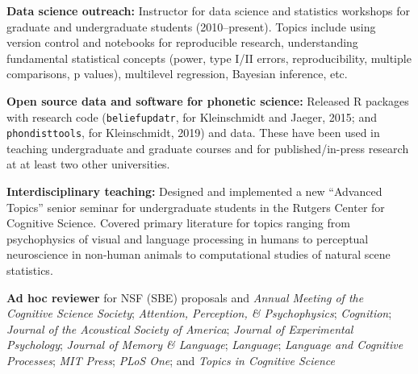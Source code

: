 \documentclass[11pt]{article}
\begin{document}
\textbf{Data science outreach:} Instructor for data science and statistics
workshops for graduate and undergraduate students (2010--present).  Topics
include using version control and notebooks for reproducible research,
understanding fundamental statistical concepts (power, type I/II errors,
reproducibility, multiple comparisons, p values), multilevel regression,
Bayesian inference, etc.

\textbf{Open source data and software for phonetic science:} Released R packages
with research code (\texttt{beliefupdatr}, for Kleinschmidt and Jaeger, 2015;
and \texttt{phondisttools}, for Kleinschmidt, 2019) and data.  These have been
used in teaching undergraduate and graduate courses and for published/in-press
research at at least two other universities.

\textbf{Interdisciplinary teaching:} Designed and implemented a new ``Advanced
Topics'' senior seminar for undergraduate students in the Rutgers Center for
Cognitive Science.  Covered primary literature for topics ranging from
psychophysics of visual and language processing in humans to perceptual
neuroscience in non-human animals to computational studies of natural scene
statistics.

\textbf{Ad hoc reviewer} for NSF (SBE) proposals and
  \emph{Annual Meeting of the Cognitive Science Society};
  \emph{Attention, Perception, \& Psychophysics};
  \emph{Cognition};
  \emph{Journal of the Acoustical Society of America};
  \emph{Journal of Experimental Psychology};
  \emph{Journal of Memory \& Language};
  \emph{Language};
  \emph{Language and Cognitive Processes};
  \emph{MIT Press};
  \emph{PLoS One}; and
  \emph{Topics in Cognitive Science}
\end{document}
